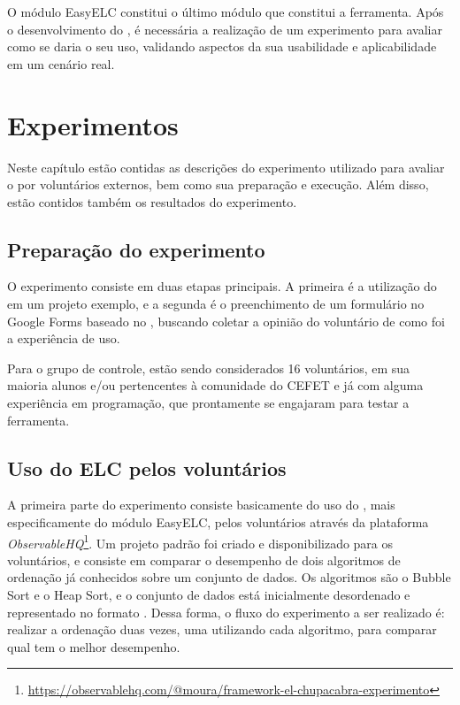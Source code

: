 \documentclass[12pt]{tcc}
\begin{document}
	O módulo EasyELC constitui o último módulo que constitui a ferramenta. Após o desenvolvimento do , é necessária a realização de um experimento para avaliar como se daria o seu uso, validando aspectos da sua usabilidade e aplicabilidade em um cenário real.

\chapter{Experimentos}
	\label{cap:experimentos}

	Neste capítulo estão contidas as descrições do experimento utilizado para avaliar o  por voluntários externos, bem como sua preparação e execução. Além disso, estão contidos também os resultados do experimento.

	\section{Preparação do experimento}
	\label{section:preparacao-experimento}

	O experimento consiste em duas etapas principais. A primeira é a utilização do  em um projeto exemplo, e a segunda é o preenchimento de um formulário no Google Forms baseado no , buscando coletar a opinião do voluntário de como foi a experiência de uso.

	Para o grupo de controle, estão sendo considerados 16 voluntários, em sua maioria alunos e/ou pertencentes à comunidade do CEFET e já com alguma experiência em programação, que prontamente se engajaram para testar a ferramenta. 


	\section{Uso do ELC pelos voluntários}
	\label{section:parte-1-experimento}




	A primeira parte do experimento consiste basicamente do uso do , mais especificamente do módulo EasyELC, pelos voluntários através da plataforma \emph{ObservableHQ}\footnote{\url{https://observablehq.com/@moura/framework-el-chupacabra-experimento}}. Um projeto padrão foi criado e disponibilizado para os voluntários, e consiste em comparar o desempenho de dois algoritmos de ordenação já conhecidos sobre um conjunto de dados. Os algoritmos são o Bubble Sort e o Heap Sort, e o conjunto de dados está inicialmente desordenado e representado no formato . Dessa forma, o fluxo do experimento a ser realizado é: realizar a ordenação duas vezes, uma utilizando cada algoritmo, para comparar qual tem o melhor desempenho.
\end{document}
